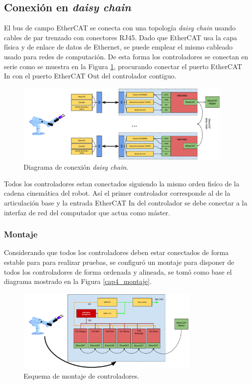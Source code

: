 \subsection{Conexión en \textit{daisy chain}}

El bus de campo EtherCAT se conecta con una topología \textit{daisy chain} usando cables de par trenzado con conectores RJ45. Dado que EtherCAT usa la capa física y de enlace de datos de Ethernet, se puede emplear el mismo cableado usado para redes de computación. De esta forma los controladores se conectan en serie como se muestra en la Figura \ref{cap4_diagrama_daisy_chain}, procurando conectar el puerto EtherCAT In con el puerto EtherCAT Out del controlador contiguo. 

\begin{figure}[H]
  \centering
  \includegraphics[width=0.95\textwidth]{img/cap4/scorbot_hardware}
  \caption{Diagrama de conexión \textit{daisy chain}.}
  \label{cap4_diagrama_daisy_chain}
\end{figure}

Todos los controladores estan conectados siguiendo la mismo orden fisíco de la cadena cinemática del robot. Así el primer controlador corresponde al de la articulación base y la entrada EtherCAT In del controlador se debe conectar a la interfaz de red del computador que actua como máster.


\subsubsection{Montaje}

Considerando que todos los controladores deben estar conectados de forma estable para para realizar pruebas, se configuró un montaje para disponer de todos los controladores de forma ordenada y alineada, se tomó como base el diagrama mostrado en la Figura \ref{cap4_montaje}. 

\begin{figure}[H]
  \centering
  \includegraphics[width=0.8\textwidth]{img/cap4/scorbot_montaje}
  \caption{Esquema de montaje de controladores.}
  \label{cap4_diagrama_montaje}
\end{figure}

